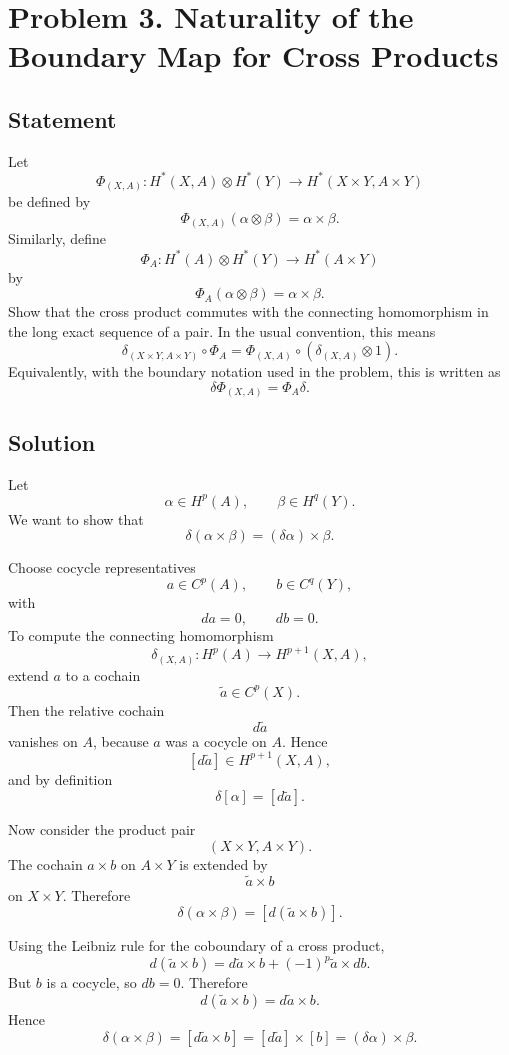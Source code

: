 \documentclass[12pt,a4paper]{article}
\theoremstyle{notespace}
\begin{document}
\section{Problem 3. Naturality of the Boundary Map for Cross Products}

\subsection*{Statement}

Let
\[
\Phi_{(X,A)}:
H^*(X,A)\otimes H^*(Y)
\longrightarrow
H^*(X\times Y,A\times Y)
\]
be defined by
\[
\Phi_{(X,A)}(\alpha\otimes \beta)=\alpha\times \beta.
\]
Similarly, define
\[
\Phi_A:
H^*(A)\otimes H^*(Y)
\longrightarrow
H^*(A\times Y)
\]
by
\[
\Phi_A(\alpha\otimes \beta)=\alpha\times \beta.
\]
Show that the cross product commutes with the connecting homomorphism in the long exact sequence of a pair. In the usual convention, this means
\[
\delta_{(X\times Y,A\times Y)}\circ \Phi_A
=
\Phi_{(X,A)}\circ(\delta_{(X,A)}\otimes 1).
\]
Equivalently, with the boundary notation used in the problem, this is written as
\[
\delta\Phi_{(X,A)}=\Phi_A\delta .
\]

\subsection*{Solution}

Let
\[
\alpha\in H^p(A),
\qquad
\beta\in H^q(Y).
\]
We want to show that
\[
\delta(\alpha\times \beta)
=
(\delta\alpha)\times \beta.
\]

Choose cocycle representatives
\[
a\in C^p(A),
\qquad
b\in C^q(Y),
\]
with
\[
da=0,
\qquad
db=0.
\]
To compute the connecting homomorphism
\[
\delta_{(X,A)}:H^p(A)\to H^{p+1}(X,A),
\]
extend \(a\) to a cochain
\[
\widetilde a\in C^p(X).
\]
Then the relative cochain
\[
d\widetilde a
\]
vanishes on \(A\), because \(a\) was a cocycle on \(A\). Hence
\[
[d\widetilde a]\in H^{p+1}(X,A),
\]
and by definition
\[
\delta[\alpha]=[d\widetilde a].
\]

Now consider the product pair
\[
(X\times Y,A\times Y).
\]
The cochain \(a\times b\) on \(A\times Y\) is extended by
\[
\widetilde a\times b
\]
on \(X\times Y\). Therefore
\[
\delta(\alpha\times \beta)
=
[d(\widetilde a\times b)].
\]

Using the Leibniz rule for the coboundary of a cross product,
\[
d(\widetilde a\times b)
=
d\widetilde a\times b
+
(-1)^p\widetilde a\times db.
\]
But \(b\) is a cocycle, so \(db=0\). Therefore
\[
d(\widetilde a\times b)
=
d\widetilde a\times b.
\]
Hence
\[
\delta(\alpha\times \beta)
=
[d\widetilde a\times b]
=
[d\widetilde a]\times [b]
=
(\delta\alpha)\times \beta.
\]
\end{document}

